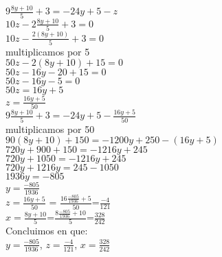 \documentclass{report}%
\begin{document}
{{$9\frac{8y+10}{5}+3=-24y+5-z$\\
$10z - 2\frac{8y+10}{5}+3=0$\\
$10z - \frac{2(8y+10)}{5}+3=0$\\
multiplicamos por 5\\
$50z-2(8y+10)+15=0 $\\
$50z-16y-20+15=0 $\\
$50z-16y-5=0$\\
$50z=16y+5$\\
$z=\frac{16y+5}{50}$\\
$9\frac{8y+10}{5}+3=-24y+5-\frac{16y+5}{50} $\\
multiplicamos por 50\\
$90(8y+10)+150=-1200y+250-(16y+5)$\\
$720y+900+150=-1216y+245$\\
$720y+1050=-1216y+245$\\
$720y+1216y=245-1050$\\
$1936y=-805$\\
$y=\frac{-805}{1936}$\\
$z=\frac{16y+5}{50}$ = $\frac{16\frac{-805}{1936}+5}{50}$=$\frac{-4}{121}$\\
$x=\frac{8y+10}{5}$=$\frac{8\frac{-805}{1936}+10}{5}$=$\frac{328}{242}$\\
Concluimos en que:\\
$y=\frac{-805}{1936}$, $z=\frac{-4}{121}$, $x=\frac{328}{242}$\\
}\\

}
\end{document}
